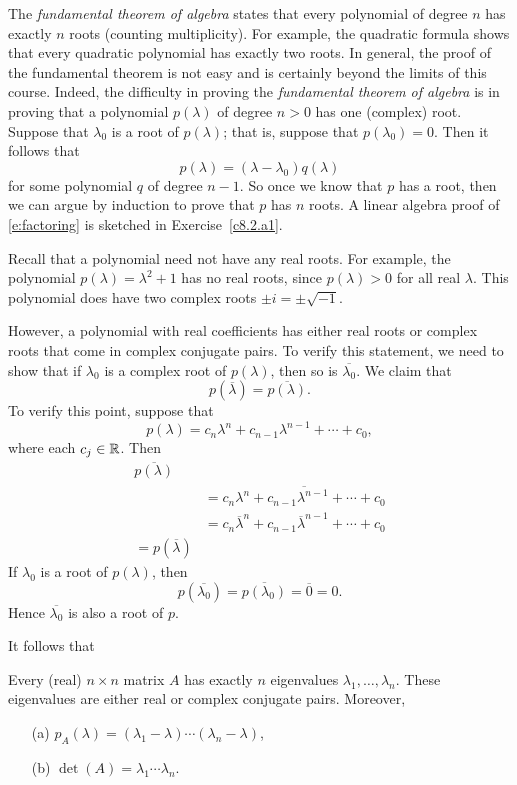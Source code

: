 \documentclass{ximera}
\begin{document}
The {\em fundamental theorem of algebra\/}  states that every polynomial of degree $n$
has exactly $n$ roots (counting multiplicity).  For example, the 
quadratic formula shows that 
every quadratic polynomial has exactly two roots.  In general, the proof 
of the fundamental theorem is not easy and is certainly beyond the 
limits of this course.  Indeed, the difficulty in proving the {\em
fundamental theorem of algebra\/} is in proving that a
polynomial $p(\lambda)$ of degree $n>0$ has one (complex) root.
Suppose that $\lambda_0$ is a root of $p(\lambda)$; that is,
suppose that $p(\lambda_0)=0$. Then it follows that
\begin{equation}  \label{e:factoring}
p(\lambda) = (\lambda-\lambda_0)q(\lambda)
\end{equation}
for some polynomial $q$ of degree $n-1$.  So once we know that
$p$ has a root, then we can argue by induction to prove that $p$
has $n$ roots.  A linear algebra proof of \eqref{e:factoring} is 
sketched in Exercise~\ref{c8.2.a1}.

Recall that a polynomial need not have any real roots. For
example, the polynomial $p(\lambda)=\lambda^2+1$ has no real
roots, since $p(\lambda)> 0$ for all real $\lambda$.  This
polynomial does have two complex roots $\pm i =\pm\sqrt{-1}$.  

However, a polynomial with real coefficients has either real
roots or complex roots that come in complex conjugate pairs.  To
verify this statement, we need to show that if $\lambda_0$ is a
complex root of $p(\lambda)$, then so is $\overline{\lambda_0}$.
We claim that 
\[
p(\overline{\lambda})=\overline{p(\lambda)}.
\]
To verify this point, suppose that
\[
p(\lambda) = c_n\lambda^n + c_{n-1}\lambda^{n-1} + \cdots + c_0,
\]
where each $c_j\in\mbox{$\Bbb{R}$}$.  Then
\begin{align*}
\overline{p(\lambda)} \\
&=\overline{c_n\lambda^n + c_{n-1}\lambda^{n-1} + \cdots + c_0}  \\
&= c_n\overline{\lambda}^n + c_{n-1}\overline{\lambda}^{n-1} + \cdots + c_0 \\
= p(\overline{\lambda})
\end{align*}
If $\lambda_0$ is a root of $p(\lambda)$, then
\[
p(\overline{\lambda_0}) = \overline{p(\lambda_0)}=\overline{0}=0.
\]
Hence $\overline{\lambda_0}$ is also a root of $p$.

It follows that 
\begin{theorem}  \label{T:eigens}
Every (real) $n\times n$ matrix $A$ has exactly $n$ eigenvalues
$\lambda_1,\ldots,\lambda_n$.  These eigenvalues are either real
or complex conjugate pairs.  Moreover,
\begin{enumerate}
\item[(a)] $p_A(\lambda) = (\lambda_1-\lambda)\cdots(\lambda_n-\lambda)$,
\item[(b)] $\det(A) = \lambda_1\cdots\lambda_n$.
\end{enumerate}
\end{theorem} 
\end{document}
